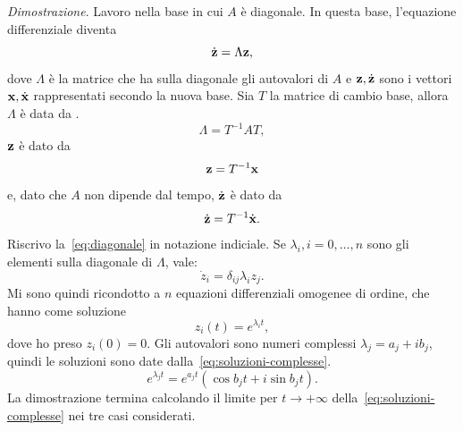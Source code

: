 \emph{Dimostrazione}.
Lavoro nella base in cui $A$ è diagonale.
In questa base, l'equazione differenziale diventa
\begin{equation}
    \dot{\mathbf{z}} = \Lambda \mathbf{z},
    \label{eq:diagonale}
\end{equation}
dove $\Lambda$ è la matrice che ha sulla diagonale
gli autovalori di $A$ e $\mathbf{z}, \dot{\mathbf{z}}$ sono i vettori $\mathbf{x}, \dot{\mathbf{x}}$ rappresentati secondo la nuova base.
Sia $T$ la matrice di cambio base, allora $\Lambda$ è data da .
\begin{equation*}
    \Lambda = T^{-1} A T,
\end{equation*}
$\mathbf{z}$ è dato da
\begin{equation*}
    \mathbf{z} = T^{-1} \mathbf{x}
\end{equation*}
e, dato che $A$ non dipende dal tempo, $\dot{\mathbf{z}}$ è dato da
\begin{equation*}
    \dot{\mathbf{z}} = T^{-1} \dot{\mathbf{x}}.
\end{equation*}
Riscrivo la~\eqref{eq:diagonale} in notazione indiciale.
Se $\lambda_i, i = 0, \ldots, n$ sono gli elementi sulla diagonale di $\Lambda$, vale:
\begin{equation*}
    \dot z_i = \delta_{ij} \lambda_i z_j.
\end{equation*}
Mi sono quindi ricondotto a $n$ equazioni differenziali omogenee di  ordine, che
hanno come soluzione
\begin{equation*}
    z_i(t) = e^{\lambda_i t},
\end{equation*}
dove ho preso $z_i(0) = 0$.
Gli autovalori sono numeri complessi $\lambda_j = a_j + i b_j$, quindi le soluzioni
sono date dalla~\eqref{eq:soluzioni-complesse}.
\begin{equation}
    e^{\lambda_j t} = e^{a_j t}\left(\cos{b_j t} + i\sin{b_j t} \right).
\label{eq:soluzioni-complesse}
\end{equation}
La dimostrazione termina calcolando il limite per $t \to +\infty$
della~\eqref{eq:soluzioni-complesse} nei tre casi considerati.
\hfill \qedsymbol \paragraph{}

